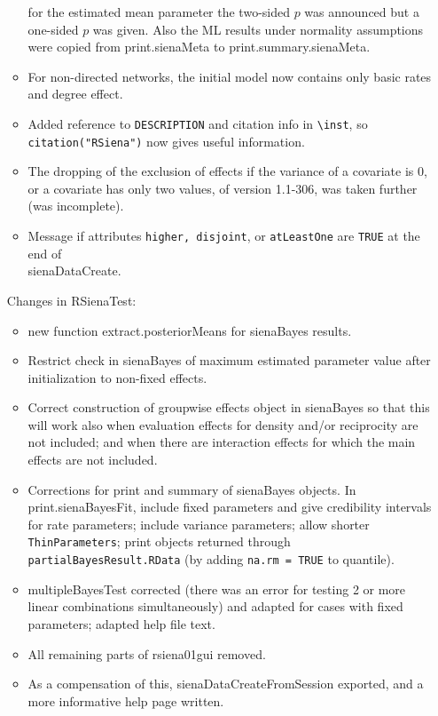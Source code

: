 \documentclass[a4paper,fleqn,11pt]{article}
\newcommand{\+}{\, + \,}
\newcommand{\sfn}[1]{\textsf{#1}}
\begin{document}
\begin{small}
\begin{itemize}
\begin{itemize}
     for the estimated mean parameter the two-sided $p$ was announced but a
     one-sided $p$ was given. Also the ML results under normality assumptions
     were copied from \sfn{print.sienaMeta} to \sfn{print.summary.sienaMeta}.
   \item For non-directed networks, the initial model now contains
    only basic rates and degree effect.
   \item Added reference to \texttt{DESCRIPTION} and citation info in
    \texttt{{\textbackslash}inst},
   so \texttt{citation("RSiena")} now gives useful information.
   \item The dropping of the exclusion of effects if the variance of a
     covariate is 0, or a covariate has only two values, of version 1.1-306,
     was  taken further (was incomplete).
   \item Message if attributes \texttt{higher, disjoint},
   or \texttt{atLeastOne} are \texttt{TRUE} at the end of \\
     \textsf{sienaDataCreate}.
   \end{itemize}
Changes in \textsf{RSienaTest}:
\begin{itemize}
   \item new function \sfn{extract.posteriorMeans} for \textsf{sienaBayes} results.
   \item Restrict check in \textsf{sienaBayes} of maximum
     estimated parameter value after initialization to non-fixed effects.
   \item Correct construction of groupwise effects object in \textsf{sienaBayes}
    so that this
     will work also when evaluation effects for density and/or reciprocity are
     not included; and when there are interaction effects for which the main
     effects are not included.
   \item Corrections for \textsf{print} and \textsf{summary} of \textsf{sienaBayes} objects.
     In \sfn{print.sienaBayesFit}, include fixed parameters and
     give credibility intervals for rate parameters; include variance parameters;
     allow shorter \texttt{ThinParameters};
     print objects returned through \\
     \texttt{partialBayesResult.RData}
     (by adding \texttt{na.rm = TRUE} to quantile).
   \item \sfn{multipleBayesTest} corrected (there was an error for testing
      2 or more linear combinations simultaneously)
       and adapted for cases with fixed  parameters;
     adapted help file text.
   \item All remaining parts of \sfn{rsiena01gui} removed.
   \item As a compensation of this, \sfn{sienaDataCreateFromSession} exported,
   and a more informative help page written.
\end{itemize}


\end{itemize}
\end{small}
\end{document}

